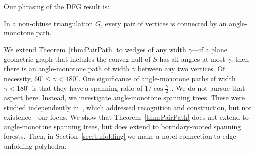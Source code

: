\documentclass{cccg17}
\newcommand{\bluenew}[1]{{#1}}  %
\newcommand{\cyannew}[1]{{#1}}  %
\newcommand{\rednote}[1]{{}}  %
\newcommand{\thmlab}[1]{\label{thm:#1}}
\newcommand{\thmref}[1]{\ref{thm:#1}}
\newcommand{\secref}[1]{\ref{sec:#1}}
\begin{document}
Our phrasing of the DFG result is: 

\begin{theorem}
In a non-obtuse triangulation $G$, 
every pair of vertices is connected by an angle-monotone path.
\thmlab{PairPath}
\end{theorem}



  We extend Theorem~\thmref{PairPath} to wedges of any width $\gamma$---if a plane geometric graph that includes the convex hull of $S$ has all angles at most $\gamma$, 
then there is an angle-monotone path of width $\gamma$ between any two vertices.
\cyannew{Of necessity, $60^\circ \le \gamma < 180^\circ$.}
One significance of angle-monotone paths of width $\gamma < 180^\circ$ is that they have a spanning ratio of $1/\cos{\frac{\gamma}{2}}$~\cite{bbcklv-gtamg-16}.  We do not pursue that aspect here.  
Instead, we investigate angle-monotone spanning trees.
\bluenew{These were studied independently in~\cite{mastakas2016rooted}, which addressed
recognition and construction, but not existence---our focus.}
We show that Theorem~\thmref{PairPath} does not extend to angle-monotone spanning trees, but  does extend to boundary-rooted spanning forests.  
Then, in Section~\secref{Unfolding} we make a novel connection to edge-unfolding polyhedra.
\end{document}
